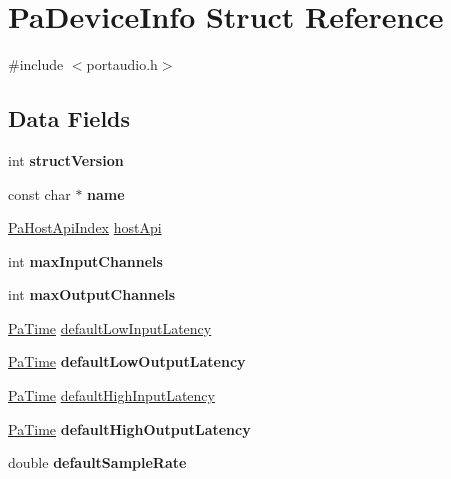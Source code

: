 \hypertarget{struct_pa_device_info}{}\section{Pa\+Device\+Info Struct Reference}
\label{struct_pa_device_info}


{\ttfamily \#include $<$portaudio.\+h$>$}

\subsection*{Data Fields}
\begin{DoxyCompactItemize}
\item 
\mbox{\label{struct_pa_device_info_a427b2098449590745eb8e4443f0b4ef8}} 
int {\bfseries struct\+Version}
\item 
\mbox{\label{struct_pa_device_info_a8f8f80d37794cde9472343e4487ba3eb}} 
const char $\ast$ {\bfseries name}
\item 
\hyperlink{portaudio_8h_aeef6da084c57c70aa94be97411e19930}{Pa\+Host\+Api\+Index} \hyperlink{struct_pa_device_info_a3d8fc4af88e885df6faf41d1a964fa1c}{host\+Api}
\item 
\mbox{\label{struct_pa_device_info_a9e96ac3f7a001f44e2e91a0737515fdf}} 
int {\bfseries max\+Input\+Channels}
\item 
\mbox{\label{struct_pa_device_info_afca87fffb347f6fc62e4e587fb355229}} 
int {\bfseries max\+Output\+Channels}
\item 
\hyperlink{portaudio_8h_af17a7e6d0471a23071acf8dbd7bbe4bd}{Pa\+Time} \hyperlink{struct_pa_device_info_a03a1f9f1cd41260fa2112a5fffae4415}{default\+Low\+Input\+Latency}
\item 
\mbox{\label{struct_pa_device_info_aac9c5007f96933bd2378ae18063e5c05}} 
\hyperlink{portaudio_8h_af17a7e6d0471a23071acf8dbd7bbe4bd}{Pa\+Time} {\bfseries default\+Low\+Output\+Latency}
\item 
\hyperlink{portaudio_8h_af17a7e6d0471a23071acf8dbd7bbe4bd}{Pa\+Time} \hyperlink{struct_pa_device_info_a017f8188bac6c71b338b740484ffbf3a}{default\+High\+Input\+Latency}
\item 
\mbox{\label{struct_pa_device_info_a374660cc30a98467127cb9b3f4862d46}} 
\hyperlink{portaudio_8h_af17a7e6d0471a23071acf8dbd7bbe4bd}{Pa\+Time} {\bfseries default\+High\+Output\+Latency}
\item 
\mbox{\label{struct_pa_device_info_a92f71a736e254129038937cad293356e}} 
double {\bfseries default\+Sample\+Rate}
\end{DoxyCompactItemize}



